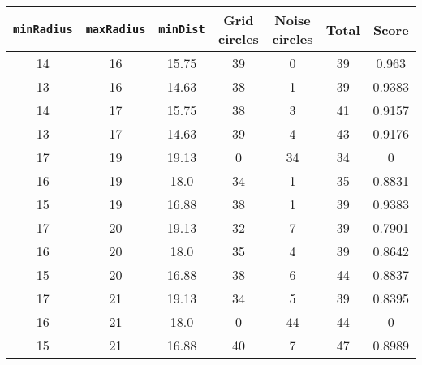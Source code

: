 \documentclass[letterpaper, 12pt]{article}
\begin{document}
\begin{longtable}{|c|c|c|c|c|c|c|}
\hline
\textbf{\texttt{minRadius}} & \textbf{\texttt{maxRadius}} & \textbf{\texttt{minDist}} & \textbf{Grid circles} & \textbf{Noise circles} & \textbf{Total} & \textbf{Score} \\
\hline
14 & 16 & 15.75 & 39 & 0 & 39 & 0.963 \\
\hline
13 & 16 & 14.63 & 38 & 1 & 39 & 0.9383 \\
\hline
14 & 17 & 15.75 & 38 & 3 & 41 & 0.9157 \\
\hline
13 & 17 & 14.63 & 39 & 4 & 43 & 0.9176 \\
\hline
17 & 19 & 19.13 & 0 & 34 & 34 & 0 \\
\hline
16 & 19 & 18.0 & 34 & 1 & 35 & 0.8831 \\
\hline
15 & 19 & 16.88 & 38 & 1 & 39 & 0.9383 \\
\hline
17 & 20 & 19.13 & 32 & 7 & 39 & 0.7901 \\
\hline
16 & 20 & 18.0 & 35 & 4 & 39 & 0.8642 \\
\hline
15 & 20 & 16.88 & 38 & 6 & 44 & 0.8837 \\
\hline
17 & 21 & 19.13 & 34 & 5 & 39 & 0.8395 \\
\hline
16 & 21 & 18.0 & 0 & 44 & 44 & 0 \\
\hline
15 & 21 & 16.88 & 40 & 7 & 47 & 0.8989 \\
\hline
\end{longtable}
\end{document}
